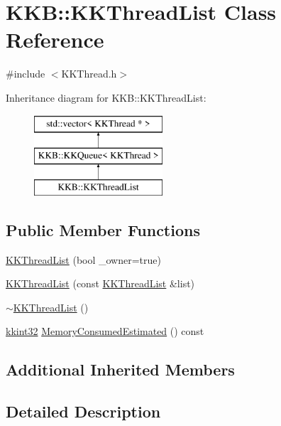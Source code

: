 \hypertarget{class_k_k_b_1_1_k_k_thread_list}{}\section{K\+KB\+:\+:K\+K\+Thread\+List Class Reference}
\label{class_k_k_b_1_1_k_k_thread_list}


{\ttfamily \#include $<$K\+K\+Thread.\+h$>$}

Inheritance diagram for K\+KB\+:\+:K\+K\+Thread\+List\+:\begin{figure}[H]
\begin{center}
\leavevmode
\includegraphics[height=3.000000cm]{class_k_k_b_1_1_k_k_thread_list}
\end{center}
\end{figure}
\subsection*{Public Member Functions}
\begin{DoxyCompactItemize}
\item 
\hyperlink{class_k_k_b_1_1_k_k_thread_list_a3e20a1118afaf9bb4257c4f7070aa954}{K\+K\+Thread\+List} (bool \+\_\+owner=true)
\item 
\hyperlink{class_k_k_b_1_1_k_k_thread_list_abf8cca344562bd3c3876c0ff9973de53}{K\+K\+Thread\+List} (const \hyperlink{class_k_k_b_1_1_k_k_thread_list}{K\+K\+Thread\+List} \&list)
\item 
\hyperlink{class_k_k_b_1_1_k_k_thread_list_a52837015c45c5e4ff3df7d4053431da8}{$\sim$\+K\+K\+Thread\+List} ()
\item 
\hyperlink{namespace_k_k_b_a8fa4952cc84fda1de4bec1fbdd8d5b1b}{kkint32} \hyperlink{class_k_k_b_1_1_k_k_thread_list_a2c29dc603b4f8b74548e286ffab9bc91}{Memory\+Consumed\+Estimated} () const 
\end{DoxyCompactItemize}
\subsection*{Additional Inherited Members}


\subsection{Detailed Description}



